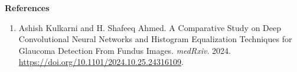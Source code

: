 \vspace{0.125in}

\noindent\textbf{References}

\renewcommand{\labelenumi}{[\arabic{enumi}]}

\begin{enumerate}
    \item Ashish Kulkarni and H. Shafeeq Ahmed. A Comparative Study on Deep Convolutional Neural Networks and Histogram Equalization Techniques for Glaucoma Detection From Fundus Images. \emph{medRxiv}. 2024. \url{https://doi.org/10.1101/2024.10.25.24316109}. \label{glaucomacnn}
\end{enumerate}

